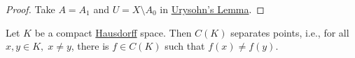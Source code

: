 \documentclass{article}
\newcommand{\K}{\mathbb{K}}
\begin{document}
\begin{proof}
    Take $A = A_1$ and $U = X \setminus A_0$ in \hyperlink{prop:urysohn}{Urysohn's Lemma}.
\end{proof}

\begin{cor}
    Let $K$ be a compact \hyperlink{def:Hausdorff}{Hausdorff} space.
    Then $C(K)$ separates points, i.e., for all $x, y \in K, \; x \neq y$, there is $f \in C(K)$ such that $f(x) \neq f(y)$.
\end{cor}

\end{document}

